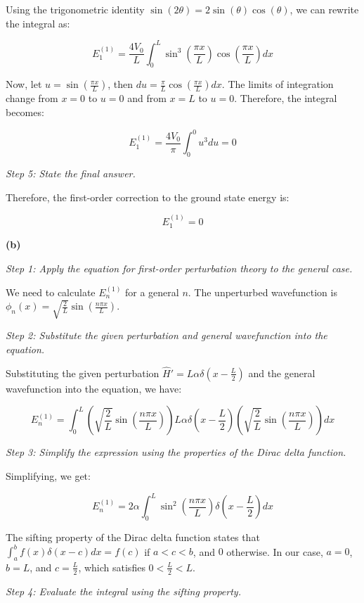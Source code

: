 \documentclass{article}
\begin{document}
Using the trigonometric identity \(\sin(2\theta) = 2\sin(\theta)\cos(\theta)\), we can rewrite the integral as:

\[
E_1^{(1)} = \frac{4V_0}{L} \int_0^L \sin^3\left(\frac{\pi x}{L}\right) \cos\left(\frac{\pi x}{L}\right) dx
\]

Now, let \(u = \sin\left(\frac{\pi x}{L}\right)\), then \(du = \frac{\pi}{L}\cos\left(\frac{\pi x}{L}\right)dx\). The limits of integration change from \(x=0\) to \(u=0\) and from \(x=L\) to \(u=0\). Therefore, the integral becomes:

\[
E_1^{(1)} = \frac{4V_0}{\pi} \int_0^0 u^3 du = 0
\]

\textit{Step 5: State the final answer.}

Therefore, the first-order correction to the ground state energy is:

\[
E_1^{(1)} = 0
\]

\textbf{(b)}

\textit{Step 1: Apply the equation for first-order perturbation theory to the general case.}

We need to calculate \(E_n^{(1)}\) for a general \(n\). The unperturbed wavefunction is \(\phi_n(x) = \sqrt{\frac{2}{L}} \sin\left(\frac{n \pi x}{L}\right)\).

\textit{Step 2: Substitute the given perturbation and general wavefunction into the equation.}

Substituting the given perturbation \(\hat{H}' = L \alpha \delta\left(x - \frac{L}{2}\right)\) and the general wavefunction into the equation, we have:

\[
E_n^{(1)} = \int_0^L \left(\sqrt{\frac{2}{L}} \sin\left(\frac{n \pi x}{L}\right)\right) L \alpha \delta\left(x - \frac{L}{2}\right) \left(\sqrt{\frac{2}{L}} \sin\left(\frac{n \pi x}{L}\right)\right) dx
\]

\textit{Step 3: Simplify the expression using the properties of the Dirac delta function.}

Simplifying, we get:

\[
E_n^{(1)} = 2 \alpha \int_0^L \sin^2\left(\frac{n \pi x}{L}\right) \delta\left(x - \frac{L}{2}\right) dx
\]

The sifting property of the Dirac delta function states that \(\int_a^b f(x) \delta(x-c) dx = f(c)\) if \(a < c < b\), and \(0\) otherwise. In our case, \(a=0\), \(b=L\), and \(c=\frac{L}{2}\), which satisfies \(0 < \frac{L}{2} < L\).

\textit{Step 4: Evaluate the integral using the sifting property.}
\end{document}
